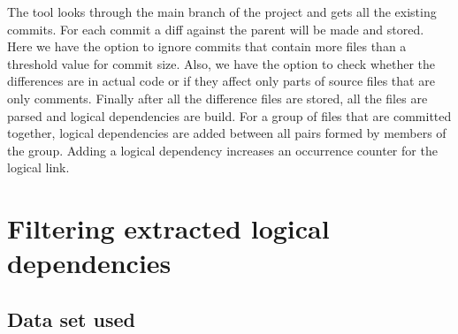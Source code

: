 \documentclass[12pt]{mitthesis}
\begin{document}
The tool looks through the main branch of the project and gets all the existing commits. For each commit a diff against the parent will be made and stored. Here we have the option to ignore commits that contain more files than a threshold value for commit size. Also, we have the option to check whether the differences are in actual code or if they affect only parts of source files that are only comments.  Finally after all the difference files are stored, all the files are parsed and logical dependencies are build. For a group of files that are committed together, logical dependencies are added between all pairs formed by members of the group. Adding a logical dependency increases an occurrence counter for the logical link. \\

\chapter {Filtering extracted logical dependencies}

\section{Data set used}
\end{document}
